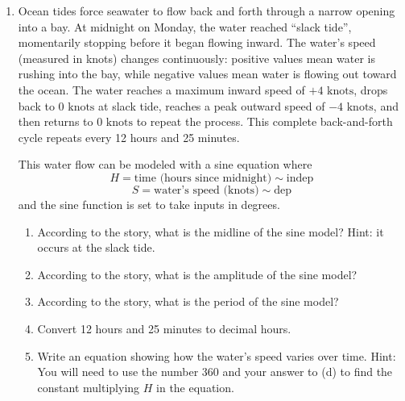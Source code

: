 \begin{enumerate}
\newpage %

\item %
Ocean tides force seawater to flow back and forth through a narrow opening into a bay. At midnight on Monday, the water reached ``slack tide'', momentarily stopping before it began flowing inward. The water's speed (measured in knots) changes continuously: positive values mean water is rushing into the bay, while negative values mean water is flowing out toward the ocean. The water reaches a maximum inward speed of $+4\text{ knots}$, drops back to $0\text{ knots}$ at slack tide, reaches a peak outward speed of $-4\text{ knots}$, and then returns to $0\text{ knots}$ to repeat the process. This complete back-and-forth cycle repeats every 12 hours and 25 minutes. 

This water flow can be modeled with a sine equation where 
$$H = \text{time (hours since midnight)} \sim \text{indep}$$
$$S = \text{water's speed (knots)} \sim \text{dep}$$
and the sine function is set to take inputs in degrees.

\begin{enumerate}
    \item According to the story, what is the midline of the sine model?  Hint: it occurs at the slack tide. \vfill
    \item According to the story, what is the amplitude of the sine model? \vfill
    \item According to the story, what is the period of the sine model? \vfill
    \item Convert 12 hours and 25 minutes to decimal hours. \vfill
    \item Write an equation showing how the water's speed varies over time.  Hint: You will need to use the number 360 and your answer to (d) to find the constant multiplying $H$ in the equation. \vfill \vfill \vfill
\end{enumerate}

\end{enumerate}


